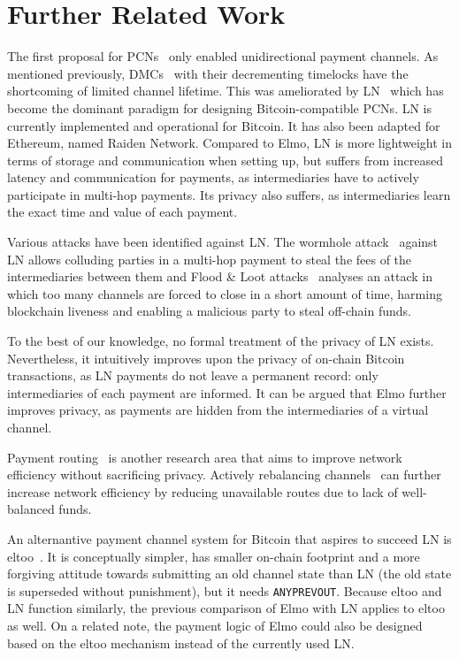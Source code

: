 \section{Further Related Work}
\label{sec:further-related-work}
 The first proposal for PCNs~\cite{spilman} only enabled
 unidirectional payment channels. As mentioned previously, DMCs~\cite{decker}
 with their decrementing timelocks have the shortcoming of limited channel
 lifetime. This was ameliorated by LN~\cite{lightning} which has become the dominant paradigm for designing Bitcoin-compatible PCNs.
 LN is currently implemented and operational for
  Bitcoin. It has also been adapted for Ethereum, named
  Raiden Network. Compared to Elmo, LN is more lightweight in terms of
  storage and communication when setting up, but suffers from increased latency
  and communication for payments, as intermediaries have to actively participate
  in multi-hop payments. Its privacy also suffers, as intermediaries
  learn the exact time and value of each payment.

Various attacks have been identified against LN. The wormhole
  attack~\cite{DBLP:conf/ndss/MalavoltaMSKM19} against LN allows
  colluding parties in a multi-hop payment to steal the fees of the
  intermediaries between them and Flood \& Loot attacks~\cite{10.1145/3419614.3423248}
  analyses an attack in which too many channels are forced to
  close in a short amount of time, harming blockchain liveness and enabling
  a malicious party to steal off-chain funds.

  To the best of our knowledge, no formal treatment of the privacy of LN exists.
  Nevertheless, it intuitively improves upon the privacy of on-chain Bitcoin
  transactions, as LN payments do not leave a permanent record: only
  intermediaries of each payment are informed. It can be argued that Elmo
  further improves privacy, as payments are hidden from
  the intermediaries of a virtual channel.

  Payment routing~\cite{spider,prihodko2016flare,lee2020routee} is another research area that aims to improve network efficiency without sacrificing  privacy. Actively rebalancing channels~\cite{DBLP:conf/ccs/KhalilG17} can
  further increase network efficiency by reducing unavailable routes due to lack of well-balanced funds.

  An alternantive payment channel system for Bitcoin that aspires to
  succeed LN is eltoo~\cite{eltoo}. It is conceptually simpler,
  has smaller on-chain footprint and a more forgiving attitude towards
  submitting an old channel state than LN (the old state is superseded without punishment), but it needs
  \texttt{ANYPREVOUT}. Because eltoo and LN function similarly, the previous comparison of
  Elmo with LN applies to eltoo as well. On a related note, the payment
  logic of Elmo could also be designed based on the eltoo mechanism instead of
  the currently used LN.

